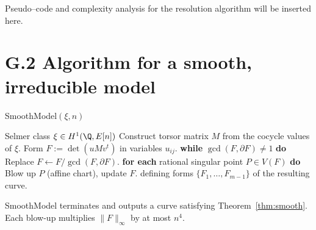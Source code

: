 
Pseudo–code and complexity analysis for the resolution algorithm will be inserted here. 

\section{G.2  Algorithm for a smooth, irreducible model}

\begin{algorithm}[H]
\caption{SmoothModel$(\xi,n)$}
\small
\begin{algorithmic}[1]
\REQUIRE Selmer class $\xi\in H^{1}(\Q,E[n])$
\STATE Construct torsor matrix $M$ from the cocycle values of $\xi$.
\STATE Form $F:=\det(uMv^{t})$ in variables $u_{ij}$.
\STATE \textbf{while} $\gcd(F,\partial F)\neq1$ \textbf{do}
    \STATE \quad Replace $F\gets F/\gcd(F,\partial F)$.
\STATE \textbf{for each} rational singular point $P\in V(F)$ \textbf{do}
    \STATE \quad Blow up $P$ (affine chart), update $F$.
\RETURN defining forms $\{F_{1},\dots,F_{m-1}\}$ of the resulting curve.
\end{algorithmic}
\end{algorithm}

\begin{proposition}
SmoothModel terminates and outputs a curve satisfying
Theorem~\ref{thm:smooth}.  Each blow-up multiplies
$\|F\|_{\infty}$ by at most $n^{4}$.
\end{proposition} 